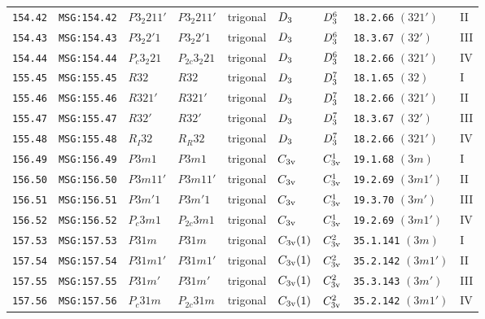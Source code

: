 \documentclass[fleqn,10pt]{jsarticle}
\begin{document}
\begin{center}
\begin{longtable}{lllllllll}
\texttt{154.42} & \texttt{MSG:154.42} & $P3_{2}211'$ & $P3_{2}211'$ & trigonal & $D_{\rm 3}$ & $D_{\rm 3}^{6}$ & \texttt{18.2.66} $(321')$ & II \\
\texttt{154.43} & \texttt{MSG:154.43} & $P3_{2}2'1$ & $P3_{2}2'1$ & trigonal & $D_{\rm 3}$ & $D_{\rm 3}^{6}$ & \texttt{18.3.67} $(32')$ & III \\
\texttt{154.44} & \texttt{MSG:154.44} & $P_{c}3_{2}21$ & $P_{2c}3_{2}21$ & trigonal & $D_{\rm 3}$ & $D_{\rm 3}^{6}$ & \texttt{18.2.66} $(321')$ & IV \\ \hline
\texttt{155.45} & \texttt{MSG:155.45} & $R32$ & $R32$ & trigonal & $D_{\rm 3}$ & $D_{\rm 3}^{7}$ & \texttt{18.1.65} $(32)$ & I \\
\texttt{155.46} & \texttt{MSG:155.46} & $R321'$ & $R321'$ & trigonal & $D_{\rm 3}$ & $D_{\rm 3}^{7}$ & \texttt{18.2.66} $(321')$ & II \\
\texttt{155.47} & \texttt{MSG:155.47} & $R32'$ & $R32'$ & trigonal & $D_{\rm 3}$ & $D_{\rm 3}^{7}$ & \texttt{18.3.67} $(32')$ & III \\
\texttt{155.48} & \texttt{MSG:155.48} & $R_{I}32$ & $R_{R}32$ & trigonal & $D_{\rm 3}$ & $D_{\rm 3}^{7}$ & \texttt{18.2.66} $(321')$ & IV \\ \hline
\texttt{156.49} & \texttt{MSG:156.49} & $P3m1$ & $P3m1$ & trigonal & $C_{\rm 3v}$ & $C_{\rm 3v}^{1}$ & \texttt{19.1.68} $(3m)$ & I \\
\texttt{156.50} & \texttt{MSG:156.50} & $P3m11'$ & $P3m11'$ & trigonal & $C_{\rm 3v}$ & $C_{\rm 3v}^{1}$ & \texttt{19.2.69} $(3m1')$ & II \\
\texttt{156.51} & \texttt{MSG:156.51} & $P3m'1$ & $P3m'1$ & trigonal & $C_{\rm 3v}$ & $C_{\rm 3v}^{1}$ & \texttt{19.3.70} $(3m')$ & III \\
\texttt{156.52} & \texttt{MSG:156.52} & $P_{c}3m1$ & $P_{2c}3m1$ & trigonal & $C_{\rm 3v}$ & $C_{\rm 3v}^{1}$ & \texttt{19.2.69} $(3m1')$ & IV \\ \hline
\texttt{157.53} & \texttt{MSG:157.53} & $P31m$ & $P31m$ & trigonal & $C_{\rm 3v}(1)$ & $C_{\rm 3v}^{2}$ & \texttt{35.1.141} $(3m)$ & I \\
\texttt{157.54} & \texttt{MSG:157.54} & $P31m1'$ & $P31m1'$ & trigonal & $C_{\rm 3v}(1)$ & $C_{\rm 3v}^{2}$ & \texttt{35.2.142} $(3m1')$ & II \\
\texttt{157.55} & \texttt{MSG:157.55} & $P31m'$ & $P31m'$ & trigonal & $C_{\rm 3v}(1)$ & $C_{\rm 3v}^{2}$ & \texttt{35.3.143} $(3m')$ & III \\
\texttt{157.56} & \texttt{MSG:157.56} & $P_{c}31m$ & $P_{2c}31m$ & trigonal & $C_{\rm 3v}(1)$ & $C_{\rm 3v}^{2}$ & \texttt{35.2.142} $(3m1')$ & IV \\ \hline

\end{longtable}
\end{center}
\end{document}
